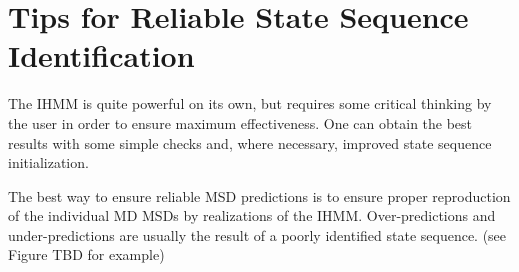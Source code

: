 \documentclass{article}
\begin{document}
  
  \section{Tips for Reliable State Sequence Identification}\label{section:fitting_tips}
  
  The IHMM is quite powerful on its own, but requires some critical thinking by
  the user in order to ensure maximum effectiveness. One can obtain 
  the best results with some simple checks and, where necessary, improved 
  state sequence initialization.
  
  The best way to ensure reliable MSD predictions is to ensure proper reproduction
  of the individual MD MSDs by realizations of the IHMM. Over-predictions and 
  under-predictions are usually the result of a poorly identified state sequence. (see
  Figure TBD for example)
  
\end{document}
